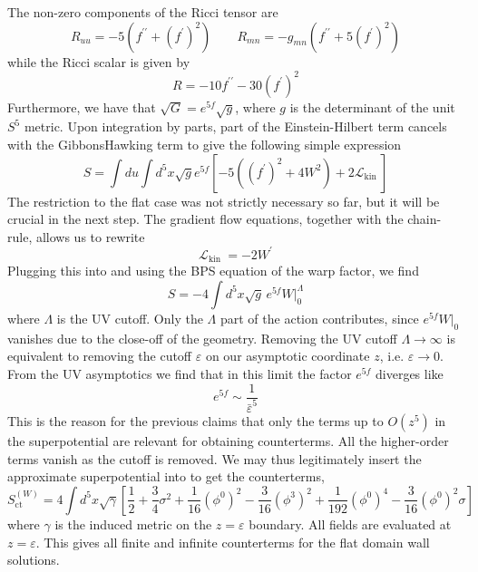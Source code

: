 \documentclass{article}
\begin{document}
The non-zero components of the Ricci tensor are
\[
R_{uu}=-5\left(f^{\prime \prime}+\left(f^{\prime}\right)^{2}\right) \quad \quad R_{mn}=-g_{mn}\left(f^{\prime \prime}+5\left(f^{\prime}\right)^{2}\right)
\]
while the Ricci scalar is given by
\[
R=-10 f^{\prime \prime}-30\left(f^{\prime}\right)^{2}
\]
Furthermore, we have that \(\sqrt{G}=e^{5 f} \sqrt{g}\), where \(g\) is the determinant of the unit \(S^{5}\) metric. Upon integration by parts, part of the Einstein-Hilbert term cancels with the GibbonsHawking term to give the following simple expression
\[
S=\int d u \int d^{5} x \sqrt{g} e^{5 f}\left[-5\left(\left(f^{\prime}\right)^{2}+4 W^{2}\right)+2 \mathcal{L}_{\text {kin }}\right]
\]
The restriction to the flat case was not strictly necessary so far, but it will be crucial in the next step. The gradient flow equations, together with the chain-rule, allows us to rewrite
\[
\mathcal{L}_{\text {kin }}=-2 W^{\prime }
\]
Plugging this into and using the BPS equation of the warp factor, we find
\[
S=-4 \int d^{5} x \sqrt{g} \, e^{5 f} W \Big|^{\Lambda}_{0}
\]
where \(\Lambda\) is the UV cutoff. Only the \(\Lambda\) part of the action contributes, since \(e^{5 f} W \Big|_{0}\) vanishes due to the close-off of the geometry. Removing the UV cutoff \(\Lambda \rightarrow \infty\) is equivalent to removing the cutoff \(\varepsilon\) on our asymptotic coordinate \(z\), i.e. \(\varepsilon \rightarrow 0\). From the UV asymptotics we find that in this limit the factor \(e^{5 f}\) diverges like
\[
e^{5 f} \sim \frac{1}{\bar{\varepsilon}^{5}}
\]
This is the reason for the previous claims that only the terms up to \(O\left(z^{5}\right)\) in the superpotential are relevant for obtaining counterterms. All the higher-order terms vanish as the cutoff is removed. We may thus legitimately insert the approximate superpotential into to get the counterterms,
\[
S_{\mathrm{ct}}^{(W)}=4 \int d^{5} x \sqrt{\gamma}\left[\frac{1}{2}+\frac{3}{4} \sigma^{2}+\frac{1}{16}\left(\phi^{0}\right)^{2}-\frac{3}{16}\left(\phi^{3}\right)^{2}+\frac{1}{192}\left(\phi^{0}\right)^{4}-\frac{3}{16}\left(\phi^{0}\right)^{2} \sigma\right]
\]
where \(\gamma\) is the induced metric on the \(z=\varepsilon\) boundary. All fields are evaluated at \(z=\varepsilon\). This gives all finite and infinite counterterms for the flat domain wall solutions.
\end{document}
